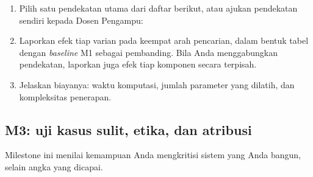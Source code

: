 \documentclass[12pt, a4paper]{article}
\begin{document}
\begin{enumerate}
  \item Pilih satu pendekatan utama dari daftar berikut, atau ajukan pendekatan sendiri kepada Dosen Pengampu:
  \item Laporkan efek tiap varian pada keempat arah pencarian, dalam bentuk tabel dengan \emph{baseline} M1 sebagai pembanding. Bila Anda menggabungkan pendekatan, laporkan juga efek tiap komponen secara terpisah.
  \item Jelaskan biayanya: waktu komputasi, jumlah parameter yang dilatih, dan kompleksitas penerapan.
\end{enumerate}

\subsection{M3: uji kasus sulit, etika, dan atribusi}

Milestone ini menilai kemampuan Anda mengkritisi sistem yang Anda bangun, selain angka yang dicapai.
\end{document}
